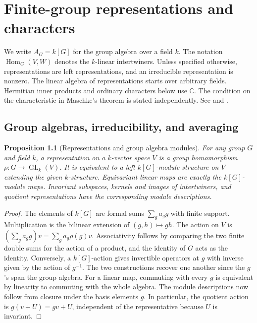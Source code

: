 \documentclass[11pt,oneside,openany]{book}
\newtheorem{proposition}[theorem]{Proposition}
\theoremstyle{definition}
\theoremstyle{remark}
\begin{document}
\chapter[Finite-group representations]{Finite-group representations and characters}
\label{p103:ch08}

We write \(A_G=k[G]\) for the group algebra over a field \(k\).
The notation \(\operatorname{Hom}_G(V,W)\) denotes the \(k\)-linear
intertwiners. Unless specified otherwise, representations are left
representations, and an irreducible representation is nonzero. The
linear algebra of representations starts over arbitrary fields.
Hermitian inner products and ordinary characters below use
\(\mathbb C\). The condition on the characteristic in Maschke's
theorem is stated independently. See \cite[Chapters 1--3 and 6]{serre}
and \cite[Chapters 17 and 21]{d07}.

\section{Group algebras, irreducibility, and averaging}

\begin{proposition}[Representations and group algebra modules]
\label{p103:ALG-07-C01-R01}
For any group \(G\) and field \(k\), a representation on a \(k\)-vector
space \(V\) is a group homomorphism
\(\rho\colon G\to\operatorname{GL}_k(V)\). It is equivalent to a left
\(k[G]\)-module structure on \(V\) extending the given \(k\)-structure.
Equivariant linear maps are exactly the \(k[G]\)-module maps.
Invariant subspaces, kernels and images of intertwiners, and quotient
representations have the corresponding module descriptions.
\end{proposition}

\begin{proof}
The elements of \(k[G]\) are formal sums \(\sum_{g} a_g g\) with finite
support. Multiplication is the bilinear extension of \((g,h)\mapsto gh\).
The action on \(V\) is \((\sum_g a_g g)v=\sum_g a_g\rho(g)v\).
Associativity follows by comparing the two finite double sums for the
action of a product, and the identity of \(G\) acts as the identity.
Conversely, a \(k[G]\)-action gives invertible operators at \(g\) with
inverse given by the action of \(g^{-1}\). The two constructions
recover one another since the \(g\)'s span the group algebra. For a
linear map, commuting with every \(g\) is equivalent by linearity to
commuting with the whole algebra. The module descriptions now follow
from closure under the basis elements \(g\). In particular, the
quotient action is \(g(v+U)=gv+U\), independent of the representative
because \(U\) is invariant.
\end{proof}
\end{document}
